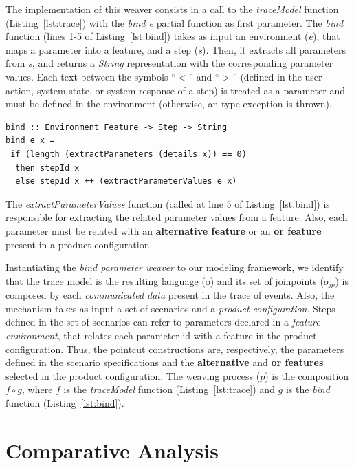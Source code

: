 \documentclass{acm_proc_article-sp}
\begin{document}
The implementation of this weaver consists in a call to 
the \emph{traceModel} function (Listing~\ref{lst:trace}) with
the \emph{bind e} partial function as first parameter. The
\emph{bind} function (lines 1-5 of Listing~\ref{lst:bind}) takes as
input an environment (\emph{e}), that maps a parameter into a
feature, and a step (\emph{s}). Then, it extracts all parameters
from \emph{s}, and returns a \emph{String} representation with the
corresponding parameter values. Each text between the symbols ``$<$'' and ``$>$''
(defined in the user action, system state, or system response of a
step) is treated as a parameter and must be defined in the
environment (otherwise, an type exception is thrown).

\begin{lstlisting}[belowskip=10pt,frame=tb,caption={The \emph{bind weaver} function},label=lst:bind]
bind :: Environment Feature -> Step -> String
bind e x =
 if (length (extractParameters (details x)) == 0)
  then stepId x
  else stepId x ++ (extractParameterValues e x)
\end{lstlisting}

The \emph{extractParameterValues} function (called at line 5 of
Listing~\ref{lst:bind}) is responsible for extracting the related
parameter values from a feature. Also, each parameter must be
related with an {\bf alternative feature} or an {\bf or feature}
present in a product configuration.

Instantiating the \emph{bind parameter weaver} to our
modeling framework, we identify that the trace model is the
resulting language (o) and its set of joinpoints ($o_{jp}$) is
composed by each \emph{communicated data} present in the trace of
events. Also, the mechanism takes as input a set of scenarios and a
\emph{product configuration}.
Steps defined in the set of scenarios can refer to parameters
declared in a \emph{feature environment}, that relates each
parameter id with a feature in the product configuration. Thus, the
pointcut constructions are, respectively, the
parameters defined in the scenario specifications and the {\bf
alternative} and {\bf or features} selected in the product
configuration. The weaving process ($p$) is the composition $f \circ
g$, where $f$ is the \emph{traceModel} function
(Listing~\ref{lst:trace}) and $g$ is the \emph{bind} function
(Listing~\ref{lst:bind}).

\section{Comparative Analysis}\label{sec:analysis}
\end{document}
